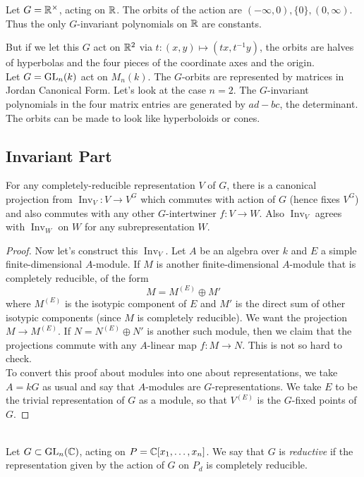\documentclass{amsart}
\DeclareMathOperator{\Inv}{Inv}
\begin{document}
Let $G = \mathbb{R}^{\times}$, acting on $\mathbb{R}$. The orbits of the action are $(-\infty,0),\{0\},(0,\infty)$. Thus the only $G$-invariant polynomials on $\mathbb{R}$ are constants.

But if we let this $G$ act on $\mathbb{R}^2$ via $t:(x,y)\mapsto (tx,t^{-1}y)$, the orbits are halves of hyperbolas and the four pieces of the coordinate axes and the origin.\\

Let $G=\operatorname{GL}_n(k)$ act on $M_n(k)$. The $G$-orbits are represented by matrices in Jordan Canonical Form. Let's look at the case $n=2$. The $G$-invariant polynomials in the four matrix entries are generated by $ad-bc$, the determinant. The orbits can be made to look like hyperboloids or cones.\\

\subsection{Invariant Part} For any completely-reducible representation $V$ of $G$, there is a canonical projection from $\Inv_V: V\to V^G$ which commutes with action of $G$ (hence fixes $V^G$) and also commutes with any other $G$-intertwiner $f:V\to W$. Also $\Inv_V$ agrees with $\Inv_W$ on $W$ for any subrepresentation $W$.
\begin{proof}
	Now let's construct this $\Inv_V$. Let $A$ be an algebra over $k$ and $E$ a simple finite-dimensional $A$-module. If $M$ is another finite-dimensional $A$-module that is completely reducible, of the form 
	$$
	M = M^{(E)}\oplus M'
	$$
	where $M^{(E)}$ is the isotypic component of $E$ and $M'$ is the direct sum of other isotypic components (since $M$ is completely reducible). We want the projection $M\to M^{(E)}$. If $N=N^{(E)}\oplus N'$ is another such module, then we claim that the projections commute with any $A$-linear map $f:M\to N$. This is not so hard to check.\\
	
	To convert this proof about modules into one about representations, we take $A=kG$ as usual and say that $A$-modules are $G$-representations. We take $E$ to be the trivial representation of $G$ as a module, so that $V^{(E)}$ is the $G$-fixed points of $G$.
\end{proof}\\

Let $G\subset \operatorname{GL}_n(\mathbb{C})$, acting on $P=\mathbb{C}[x_1,\dots,x_n]$. We say that $G$ is \textit{reductive} if the representation given by the action of $G$ on $P_d$ is completely reducible.\\
\end{document}

